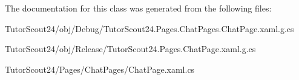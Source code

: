 The documentation for this class was generated from the following files\+:\begin{DoxyCompactItemize}
\item 
Tutor\+Scout24/obj/\+Debug/Tutor\+Scout24.\+Pages.\+Chat\+Pages.\+Chat\+Page.\+xaml.\+g.\+cs\item 
Tutor\+Scout24/obj/\+Release/Tutor\+Scout24.\+Pages.\+Chat\+Page.\+xaml.\+g.\+cs\item 
Tutor\+Scout24/\+Pages/\+Chat\+Pages/Chat\+Page.\+xaml.\+cs\end{DoxyCompactItemize}
